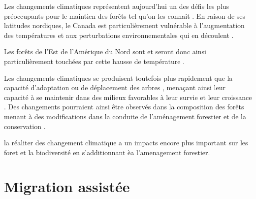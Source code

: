 Les changements climatiques représentent aujourd'hui un des défis les plus préoccupants pour le maintien des forêts tel qu'on les connait \citep{McKenney2009Climatechange,Trumbore2015Foresthealth,Seidl2017Forestdisturbances,Messier2022Warningnatural}.  
En raison de ses latitudes nordiques, le Canada est particulièrement vulnérable à l'augmentation des températures et aux perturbations environnementales qui en découlent \citep{Alo2008Potentialfuture,Bush2019Canadachanging}. 

Les forêts de l'Est de l'Amérique du Nord sont et seront donc ainsi particulièrement touchées par cette hausse de température \citep{Park2014Canboreal,Mahony2017closerlook,Sittaro2017Treerange,Messier2022Warningnatural}.


Les changements climatiques se produisent toutefois plus rapidement que la capacité d'adaptation ou de déplacement des arbres \citep{Aitken2008Adaptationmigration,Loarie2009velocityclimate,Vitt2010Assistedmigration,Harrison2020Plantcommunity}, 
menaçant ainsi leur capacité à se maintenir dans des milieux favorables à leur survie et leur croissance \citep{Zhu2012Failuremigrate,Sittaro2017Treerange,Woodall2018Decadalchanges}.
Des changements pourraient ainsi être observés dans la composition des forêts menant à des modifications dans la conduite de l'aménagement forestier et de la conservation \citep{McKenney2009Climatechange,Chmura2011Forestresponses,Lo2011Linkingclimate}.




la réaliter des changement climatique a un impacts encore plus important sur les foret et la biodiversité en s'additionnant èa l'amenagement forestier. \citep{Tremblay2018Harvestinginteracts,Ochs2022Responseterrestrial,Bouderbala2023Longtermeffect}




\section*{Migration assistée}
\label{sec:fam}


